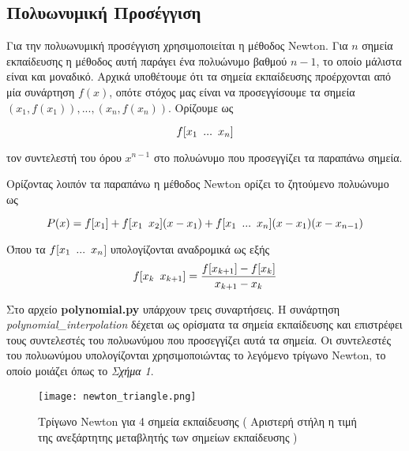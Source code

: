 \documentclass[Second Project.tex]{subfiles}
\begin{document}
\subsection{ Πολυωνυμική Προσέγγιση }

Για την πολυωνυμική προσέγγιση χρησιμοποιείται η μέθοδος \textlatin{Newton}. Για $n$ σημεία 
εκπαίδευσης η μέθοδος αυτή παράγει ένα πολυώνυμο βαθμού $n-1$, το οποίο μάλιστα είναι και μοναδικό. 
Αρχικά υποθέτουμε ότι τα σημεία εκπαίδευσης προέρχονται από μία συνάρτηση $f(x)$, οπότε στόχος μας 
είναι να προσεγγίσουμε τα σημεία $(x_{1},f(x_{1})),...,(x_{n},f(x_{n}))$. Ορίζουμε ως 

\begin{equation*}
    f[x_{1} \hspace{5px}...\hspace{5px} x_{n}] 
\end{equation*}

τον συντελεστή του όρου $x^{n-1}$ στο πολυώνυμο που προσεγγίζει τα παραπάνω σημεία.

Ορίζοντας λοιπόν τα παραπάνω η μέθοδος \textlatin{Newton} ορίζει το ζητούμενο πολυώνυμο ως

\begin{equation*}
P(x) = f[x_{1}] + f[x_{1} \hspace{5px}x_{2}](x-x_{1}) + f[x_{1}\hspace{5px} ...\hspace{5px} x_{n}](x-x_{1})(x-x_{n-1}) 
\end{equation*}

Όπου τα $f[x_{1}\hspace{5px} ... \hspace{5px}x_{n}$] υπολογίζονται αναδρομικά ως εξής
\begin{equation*}
    f[x_{k} \hspace{5px} x_{k+1}] = \frac{f[x_{k+1}] - f[x_{k}]}{x_{k+1}-x_{k}}
\end{equation*}

Στο αρχείο \textlatin{\textbf{polynomial.py}} υπάρχουν τρεις συναρτήσεις. Η συνάρτηση \textlatin{\textit{polynomial\_interpolation}} δέχεται ως 
ορίσματα τα σημεία εκπαίδευσης και επιστρέφει τους συντελεστές του πολυωνύμου που προσεγγίζει αυτά τα σημεία. Οι συντελεστές του πολυωνύμου 
υπολογίζονται χρησιμοποιώντας το λεγόμενο τρίγωνο \textlatin{Newton}, το οποίο μοιάζει όπως το \textit{Σχήμα 1}. 

\vspace{5px}
\begin{figure}[h!]
    \centering
    \captionsetup{justification=centering}
    \begin{center}
        \texttt{[image: newton\_triangle.png]}    
        \caption{ Τρίγωνο \textlatin{Newton} για 4 σημεία εκπαίδευσης ( Αριστερή στήλη η τιμή της ανεξάρτητης μεταβλητής των σημείων 
                                                                        εκπαίδευσης ) }
    \end{center}
\end{figure}
\end{document}
